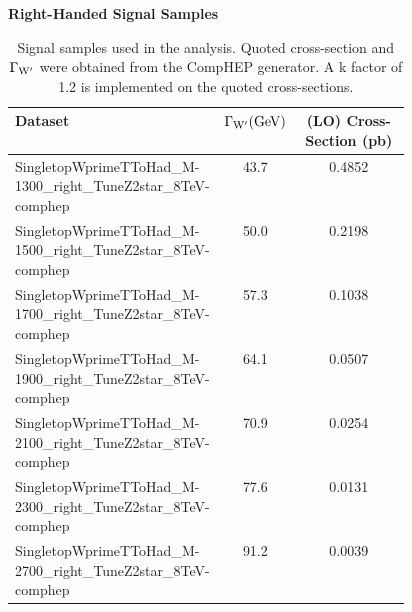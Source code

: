 \begin{table}
\begin{center}
\bf{Right-Handed Signal Samples}
\begin{tabular}{|p{0.46\linewidth}|c|c|}
\hline
\bf{Dataset} & \bf{$\Gamma_{\mathrm{W}^\prime} (\mathrm{GeV})$} & \bf{(LO) Cross-Section (pb)} \\
\hline
SingletopWprimeTToHad\_M-1300\_right\_TuneZ2star\_8TeV-comphep & 43.7 & 0.4852 \\
\hline
SingletopWprimeTToHad\_M-1500\_right\_TuneZ2star\_8TeV-comphep  & 50.0 & 0.2198 \\
\hline
SingletopWprimeTToHad\_M-1700\_right\_TuneZ2star\_8TeV-comphep  & 57.3 & 0.1038 \\
\hline
SingletopWprimeTToHad\_M-1900\_right\_TuneZ2star\_8TeV-comphep  & 64.1 & 0.0507 \\
\hline
SingletopWprimeTToHad\_M-2100\_right\_TuneZ2star\_8TeV-comphep  & 70.9 & 0.0254 \\
\hline
SingletopWprimeTToHad\_M-2300\_right\_TuneZ2star\_8TeV-comphep  & 77.6 & 0.0131 \\
\hline
SingletopWprimeTToHad\_M-2700\_right\_TuneZ2star\_8TeV-comphep  & 91.2 & 0.0039 \\
\hline
\end{tabular}
\end{center}
\caption{Signal samples used in the analysis.  Quoted cross-section and $\Gamma_{\mathrm{W}^\prime}$ were obtained from the CompHEP generator. A k factor of 1.2 is implemented on the quoted cross-sections.}
\label{table:signalsets}
\end{table}


